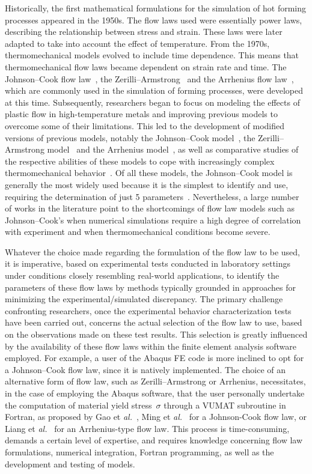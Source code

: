 \documentclass[algorithms,article,submit,pdftex,oneauthors]{Definitions/mdpi}
\makeatletter
\DeclareRobustCommand{\eal}{et \emph{al.}\@\xspace}
\makeatother
\begin{document}
Historically, the first mathematical formulations for the simulation of hot forming processes appeared in the 1950s.
The flow laws used were essentially power laws, describing the relationship between stress and strain.
These laws were later adapted to take into account the effect of temperature.
From the 1970s, thermomechanical models evolved to include time dependence.
This means that thermomechanical flow laws became dependent on strain rate and time.
The Johnson--Cook flow law~\cite{Johnson-1983-CMD}, the Zerilli--Armstrong~\cite{Zerilli-1987-DMB} and the Arrhenius flow law~\cite{Jonas-1969}, which are commonly used in the simulation of forming processes, were developed at this time.
Subsequently, researchers began to focus on modeling the effects of plastic flow in high-temperature metals and improving previous models to overcome some of their limitations.
This led to the development of modified versions of previous models, notably the Johnson--Cook model~\cite{Duc-Toan-2012-MJC, Li-2013-MJC, Zhang-2015}, the Zerilli--Armstrong model~\cite{He-2014-MZA, Gurusamy-2017-OTP, Yu-2020-FSM} and the Arrhenius model~\cite{Zhan-2014-CMF, Liang-2022}, as well as comparative studies of the respective abilities of these models to cope with increasingly complex thermomechanical behavior~\cite{Liu-2020-FSP}.
Of all these models, the Johnson--Cook model is generally the most widely used because it is the simplest to identify and use, requiring the determination of just 5 parameters~\cite{Zeng-2022-TCR}.
Nevertheless, a large number of works in the literature point to the shortcomings of flow law models such as Johnson--Cook's when numerical simulations require a high degree of correlation with experiment and when thermomechanical conditions become severe.

Whatever the choice made regarding the formulation of the flow law to be used, it is imperative, based on experimental tests conducted in laboratory settings under conditions closely resembling real-world applications, to identify the parameters of these flow laws by methods typically grounded in approaches for minimizing the experimental/simulated discrepancy.
The primary challenge confronting researchers, once the experimental behavior characterization tests have been carried out, concerns the actual selection of the flow law to use, based on the observations made on these test results.
This selection is greatly influenced by the availability of these flow laws within the finite element analysis software employed.
For example, a user of the Abaqus FE code is more inclined to opt for a Johnson--Cook flow law, since it is natively implemented.
The choice of an alternative form of flow law, such as Zerilli--Armstrong or Arrhenius, necessitates, in the case of employing the Abaqus software, that the user personally undertake the computation of material yield stress~$\sigma$ through a VUMAT subroutine in Fortran, as proposed by Gao \eal~\cite{Gao-2007-FRT}, Ming \eal~\cite{Ming-2018-ERV} for a Johnson-Cook flow law, or Liang \eal~\cite{Liang-2022} for an Arrhenius-type flow law.
This process is time-consuming, demands a certain level of expertise, and requires knowledge concerning flow law formulations, numerical integration, Fortran programming, as well as the development and testing of models.
\end{document}

